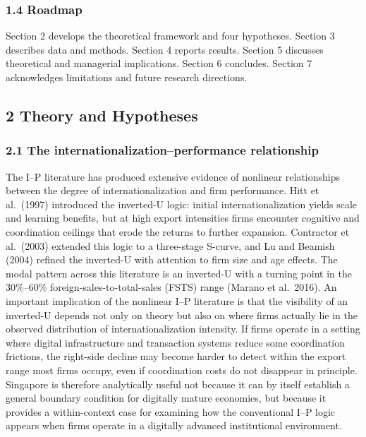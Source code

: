 \documentclass[
  12pt,a4paper]{article}
\begin{document}
\hypertarget{roadmap}{%
\subsubsection{1.4 Roadmap}\label{roadmap}}

Section 2 develops the theoretical framework and four hypotheses.
Section 3 describes data and methods. Section 4 reports results. Section
5 discusses theoretical and managerial implications. Section 6
concludes. Section 7 acknowledges limitations and future research
directions.

\hypertarget{theory-and-hypotheses}{%
\subsection{2 Theory and Hypotheses}\label{theory-and-hypotheses}}

\hypertarget{the-internationalizationperformance-relationship}{%
\subsubsection{2.1 The internationalization--performance
relationship}\label{the-internationalizationperformance-relationship}}

The I--P literature has produced extensive evidence of nonlinear
relationships between the degree of internationalization and firm
performance. Hitt et al.~(1997) introduced the inverted-U logic: initial
internationalization yields scale and learning benefits, but at high
export intensities firms encounter cognitive and coordination ceilings
that erode the returns to further expansion. Contractor et al.~(2003)
extended this logic to a three-stage S-curve, and Lu and Beamish (2004)
refined the inverted-U with attention to firm size and age effects. The
modal pattern across this literature is an inverted-U with a turning
point in the 30\%--60\% foreign-sales-to-total-sales (FSTS) range
(Marano et al.~2016). An important implication of the nonlinear I--P
literature is that the visibility of an inverted-U depends not only on
theory but also on where firms actually lie in the observed distribution
of internationalization intensity. If firms operate in a setting where
digital infrastructure and transaction systems reduce some coordination
frictions, the right-side decline may become harder to detect within the
export range most firms occupy, even if coordination costs do not
disappear in principle. Singapore is therefore analytically useful not
because it can by itself establish a general boundary condition for
digitally mature economies, but because it provides a within-context
case for examining how the conventional I--P logic appears when firms
operate in a digitally advanced institutional environment.
\end{document}
